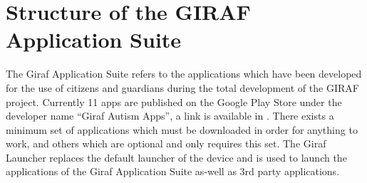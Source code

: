 \section{Structure of the GIRAF Application Suite}

The Giraf Application Suite refers to the applications which have been developed for the use of citizens and guardians during the total development of the GIRAF project. 
Currently 11 apps are published on the Google Play Store under the developer name ``Giraf Autism Apps'', a link is available in \cite{GIRAFGOOGLEPLAY}.
There exists a minimum set of applications which must be downloaded in order for anything to work, and others which are optional and only requires this set. 
The Giraf Launcher replaces the default launcher of the device and is used to launch the applications of the Giraf Application Suite as-well as 3rd party applications. 
